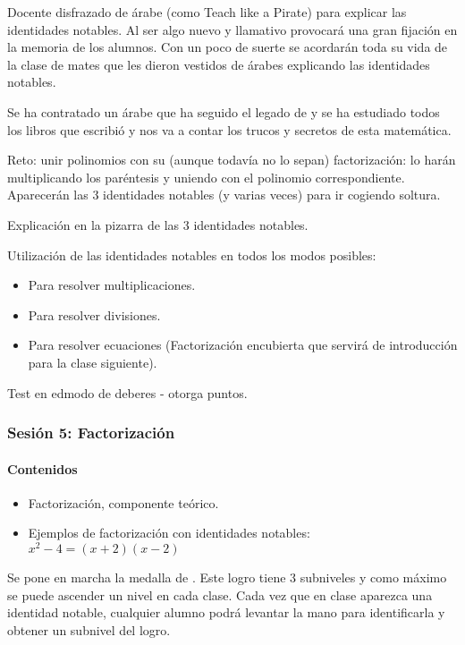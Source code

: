 Docente disfrazado de árabe (como Teach like a Pirate) para explicar las identidades notables.
%
Al ser algo nuevo y llamativo provocará una gran fijación en la memoria de los alumnos.
%
Con un poco de suerte se acordarán toda su vida de la clase de mates que les dieron vestidos de árabes explicando las identidades notables.

Se ha contratado un árabe que ha seguido el legado de \Arab y se ha estudiado todos los libros que escribió y nos va a contar los trucos y secretos de esta matemática.

Reto: unir polinomios con su (aunque todavía no lo sepan) factorización: lo harán multiplicando los paréntesis y uniendo con el polinomio correspondiente.
%
Aparecerán las 3 identidades notables (y varias veces) para ir cogiendo soltura.


Explicación en la pizarra de las 3 identidades notables.

Utilización de las identidades notables en todos los modos posibles:
\begin{itemize}
	\item Para resolver multiplicaciones.
	\item Para resolver divisiones.
	\item Para resolver ecuaciones (Factorización encubierta que servirá de introducción para la clase siguiente).
\end{itemize}



Test en edmodo de deberes - otorga puntos.


\subsubsection{Sesión 5: Factorización}


\paragraph{Contenidos}
\begin{itemize}
	\item Factorización, componente teórico.
	\item Ejemplos de factorización con identidades notables: $x^2-4 = (x+2)(x-2)$
\end{itemize}

Se pone en marcha la medalla de .
%
Este logro tiene 3 subniveles y como máximo se puede ascender un nivel en cada clase.
%
Cada vez que en clase aparezca una identidad notable, cualquier alumno podrá levantar la mano para identificarla y obtener un subnivel del logro.

